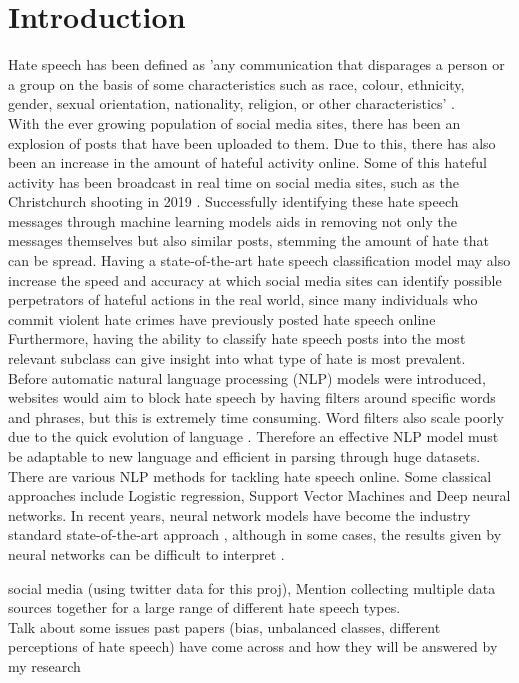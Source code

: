 \documentclass[conference]{IEEEtran}
\begin{document}
\section{Introduction}
Hate speech has been defined as 'any communication that disparages a person or a group on the basis of some characteristics such as race, colour, ethnicity, gender, sexual orientation, nationality, religion, or other characteristics' \cite{b1}. \\
With the ever growing population of social media sites, there has been an explosion of posts that have been uploaded to them. Due to this, there has also been an increase in the amount of hateful activity online. Some of this hateful activity has been broadcast in real time on social media sites, such as the Christchurch shooting in 2019 \cite{b6}. Successfully identifying these hate speech messages through machine learning models aids in removing not only the messages themselves but also similar posts, stemming the amount of hate that can be spread. Having a state-of-the-art hate speech classification model may also increase the speed and accuracy at which social media sites can identify possible perpetrators of hateful actions in the real world, since many individuals who commit violent hate crimes have previously posted hate speech online \cite{b7} Furthermore, having the ability to classify hate speech posts into the most relevant subclass can give insight into what type of hate is most prevalent.\\
Before automatic natural language processing (NLP) models were introduced, websites would aim to block hate speech by having filters around specific words and phrases, but this is extremely time consuming. Word filters also scale poorly due to the quick evolution of language \cite{b2, b3}. Therefore an effective NLP model must be adaptable to new language and efficient in parsing through huge datasets. \\
There are various NLP methods for tackling hate speech online. Some classical approaches include Logistic regression, Support Vector Machines and Deep neural networks. In recent years, neural network models have become the industry standard state-of-the-art approach \cite{b4}, although in some cases, the results given by neural networks can be difficult to interpret \cite{b5}.

social media (using twitter data for this proj), Mention collecting multiple data sources together for a large range of different hate speech types.\\ Talk about some issues past papers (bias, unbalanced classes, different perceptions of hate speech) have come across and how they will be answered by my research
\end{document}
